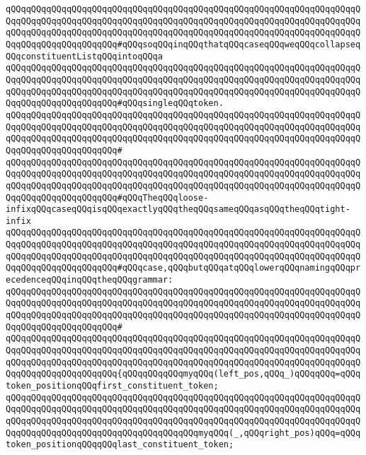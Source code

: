 \verb|qQQqqQQqqQQqqQQqqQQqqQQqqQQqqQQqqQQqqQQqqQQqqQQqqQQqqQQqqQQqqQQqqQQqqQQqqQQqqQQqqQQqqQQqqQQqqQQqqQQqqQQqqQQqqQQqqQQqqQQqqQQqqQQqqQQqqQQqqQQqqQQqqQQqqQQqqQQqqQQqqQQqqQQqqQQqqQQqqQQqqQQqqQQqqQQqqQQqqQQqqQQqqQQqqQQqqQQqqQQqqQQqqQQqqQQq#qQQqsoqQQqinqQQqthatqQQqcaseqQQqweqQQqcollapseqQQqconstituentListqQQqintoqQQqa|\newline
\verb|qQQqqQQqqQQqqQQqqQQqqQQqqQQqqQQqqQQqqQQqqQQqqQQqqQQqqQQqqQQqqQQqqQQqqQQqqQQqqQQqqQQqqQQqqQQqqQQqqQQqqQQqqQQqqQQqqQQqqQQqqQQqqQQqqQQqqQQqqQQqqQQqqQQqqQQqqQQqqQQqqQQqqQQqqQQqqQQqqQQqqQQqqQQqqQQqqQQqqQQqqQQqqQQqqQQqqQQqqQQqqQQqqQQqqQQq#qQQqsingleqQQqtoken.|\newline
\verb|qQQqqQQqqQQqqQQqqQQqqQQqqQQqqQQqqQQqqQQqqQQqqQQqqQQqqQQqqQQqqQQqqQQqqQQqqQQqqQQqqQQqqQQqqQQqqQQqqQQqqQQqqQQqqQQqqQQqqQQqqQQqqQQqqQQqqQQqqQQqqQQqqQQqqQQqqQQqqQQqqQQqqQQqqQQqqQQqqQQqqQQqqQQqqQQqqQQqqQQqqQQqqQQqqQQqqQQqqQQqqQQqqQQqqQQq#|\newline
\verb|qQQqqQQqqQQqqQQqqQQqqQQqqQQqqQQqqQQqqQQqqQQqqQQqqQQqqQQqqQQqqQQqqQQqqQQqqQQqqQQqqQQqqQQqqQQqqQQqqQQqqQQqqQQqqQQqqQQqqQQqqQQqqQQqqQQqqQQqqQQqqQQqqQQqqQQqqQQqqQQqqQQqqQQqqQQqqQQqqQQqqQQqqQQqqQQqqQQqqQQqqQQqqQQqqQQqqQQqqQQqqQQqqQQqqQQq#qQQqTheqQQqloose-infixqQQqcaseqQQqisqQQqexactlyqQQqtheqQQqsameqQQqasqQQqtheqQQqtight-infix|\newline
\verb|qQQqqQQqqQQqqQQqqQQqqQQqqQQqqQQqqQQqqQQqqQQqqQQqqQQqqQQqqQQqqQQqqQQqqQQqqQQqqQQqqQQqqQQqqQQqqQQqqQQqqQQqqQQqqQQqqQQqqQQqqQQqqQQqqQQqqQQqqQQqqQQqqQQqqQQqqQQqqQQqqQQqqQQqqQQqqQQqqQQqqQQqqQQqqQQqqQQqqQQqqQQqqQQqqQQqqQQqqQQqqQQqqQQqqQQq#qQQqcase,qQQqbutqQQqatqQQqlowerqQQqnamingqQQqprecedenceqQQqinqQQqtheqQQqgrammar:|\newline
\verb|qQQqqQQqqQQqqQQqqQQqqQQqqQQqqQQqqQQqqQQqqQQqqQQqqQQqqQQqqQQqqQQqqQQqqQQqqQQqqQQqqQQqqQQqqQQqqQQqqQQqqQQqqQQqqQQqqQQqqQQqqQQqqQQqqQQqqQQqqQQqqQQqqQQqqQQqqQQqqQQqqQQqqQQqqQQqqQQqqQQqqQQqqQQqqQQqqQQqqQQqqQQqqQQqqQQqqQQqqQQqqQQqqQQqqQQq#|\newline
\verb|qQQqqQQqqQQqqQQqqQQqqQQqqQQqqQQqqQQqqQQqqQQqqQQqqQQqqQQqqQQqqQQqqQQqqQQqqQQqqQQqqQQqqQQqqQQqqQQqqQQqqQQqqQQqqQQqqQQqqQQqqQQqqQQqqQQqqQQqqQQqqQQqqQQqqQQqqQQqqQQqqQQqqQQqqQQqqQQqqQQqqQQqqQQqqQQqqQQqqQQqqQQqqQQqqQQqqQQqqQQqqQQqqQQqqQQq{qQQqqQQqqQQqmyqQQq(left_pos,qQQq_)qQQqqQQq=qQQqtoken_positionqQQqfirst_constituent_token;|\newline
\verb|qQQqqQQqqQQqqQQqqQQqqQQqqQQqqQQqqQQqqQQqqQQqqQQqqQQqqQQqqQQqqQQqqQQqqQQqqQQqqQQqqQQqqQQqqQQqqQQqqQQqqQQqqQQqqQQqqQQqqQQqqQQqqQQqqQQqqQQqqQQqqQQqqQQqqQQqqQQqqQQqqQQqqQQqqQQqqQQqqQQqqQQqqQQqqQQqqQQqqQQqqQQqqQQqqQQqqQQqqQQqqQQqqQQqqQQqqQQqqQQqqQQqqQQqmyqQQq(_,qQQqright_pos)qQQq=qQQqtoken_positionqQQqqQQqlast_constituent_token;|\newline
